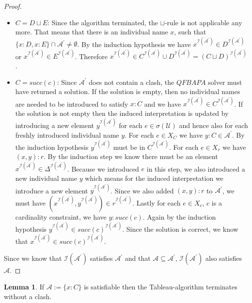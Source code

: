 \documentclass{book}
\theoremstyle{break}
\theoremstyle{definition}
\newtheorem{mylem}{Lemma}
\begin{document}
\begin{proof}
\begin{itemize}
\item $C=D\sqcup E$: Since the algorithm terminated, the $\sqcup$-rule is not applicable any more. That means that there is an individual name $x$, such that $\{x:D, x:E\}\cap \mathcal{A}^\prime\neq \emptyset$. By the induction hypothesis we have $x^{\mathcal{I}(\mathcal{A}^\prime)}\in D^{\mathcal{I}(\mathcal{A}^\prime)}$ or $x^{\mathcal{I}(\mathcal{A}^\prime)}\in E^{\mathcal{I}(\mathcal{A}^\prime)}$. Therefore $x^{\mathcal{I}(\mathcal{A}^\prime)}\in C^{\mathcal{I}(\mathcal{A}^\prime)}\cup D^{\mathcal{I}(\mathcal{A}^\prime)}=(C\sqcup D)^{\mathcal{I}(\mathcal{A}^\prime)}$.
\item $C=succ(c)$: Since $\mathcal{A}^\prime$ does not contain a clash, the $QFBAPA$ solver must have returned a solution. If the solution is empty, then no individual names are needed to be introduced to satisfy $x:C$ and we have $x^{\mathcal{I}(\mathcal{A}^\prime)}\in C^{\mathcal{I}(\mathcal{A}^\prime)}$. If the solution is not empty then the induced interpretation is updated by introducing a new element $y^{\mathcal{I}(\mathcal{A}^\prime)}$ for each $e\in \sigma(\mathcal{U})$ and hence also for each freshly introduced individual name $y$. For each $e\in X_C$ we have $y:C\in \mathcal{A}^\prime$. By the induction hypothesis $y^{\mathcal{I}(\mathcal{A}^\prime)}$ must be in $C^{\mathcal{I}(\mathcal{A}^\prime)}$. For each $e\in X_r$ we have $(x,y):r$. By the induction step we know there must be an element $x^{\mathcal{I}(\mathcal{A}^\prime)}\in\Delta^{\mathcal{I}(\mathcal{A}^\prime)}$. Because we introduced $e$ in this step, we also introduced a new individual name $y$ which means for the induced interpretation we introduce a new element $y^{\mathcal{I}(\mathcal{A}^\prime)}$. Since we also added $(x,y):r$ to $\mathcal{A}^\prime$, we must have $(x^{\mathcal{I}(\mathcal{A}^\prime)},y^{\mathcal{I}(\mathcal{A}^\prime)})\in r^{\mathcal{I}(\mathcal{A}^\prime)}$. Lastly for each $e\in X_c$, $c$ is a cardinality constraint, we have $y:succ(c)$. Again by the induction hypothesis $y^{\mathcal{I}(\mathcal{A}^\prime)}\in succ(c)^{\mathcal{I}(\mathcal{A}^\prime)}$. Since the solution is correct, we know that $x^{\mathcal{I}(\mathcal{A}^\prime)}\in succ(c)^{\mathcal{I}(\mathcal{A}^\prime)}$.
\end{itemize}
Since we know that $\mathcal{I}(\mathcal{A}^\prime)$ satisfies $\mathcal{A}^\prime$ and that $\mathcal{A}\subseteq \mathcal{A}^\prime$, $\mathcal{I}(\mathcal{A}^\prime)$ also satisfies $\mathcal{A}$.
\end{proof}
\begin{mylem}
If $\mathcal{A}:=\{x:C\}$ is satisfiable then the Tableau-algorithm terminates without a clash.
\end{mylem}
\end{document}
